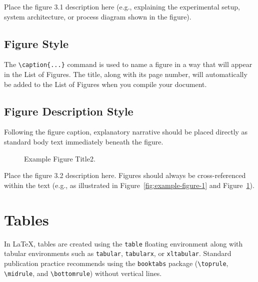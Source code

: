 Place the figure 3.1 description here (e.g., explaining the experimental setup, system architecture, or process diagram shown in the figure).

\subsection{Figure Style}
\label{sec:figure-style}

The \texttt{\textbackslash caption\{...\}} command is used to name a figure in a way that will appear in the List of Figures. The title, along with its page number, will automatically be added to the List of Figures when you compile your document.

\subsection{Figure Description Style}
\label{sec:figure-desc-style}

Following the figure caption, explanatory narrative should be placed directly as standard body text immediately beneath the figure.

\begin{figure}[htbp]
  \centering
  \caption{Example Figure Title2.}
  \label{fig:example-figure-2}
\end{figure}

Place the figure 3.2 description here. Figures should always be cross-referenced within the text (e.g., as illustrated in Figure~\ref{fig:example-figure-1} and Figure~\ref{fig:example-figure-2}).

\section{Tables}
\label{sec:tables}

In LaTeX, tables are created using the \texttt{table} floating environment along with tabular environments such as \texttt{tabular}, \texttt{tabularx}, or \texttt{xltabular}. Standard publication practice recommends using the \texttt{booktabs} package (\texttt{\textbackslash toprule}, \texttt{\textbackslash midrule}, and \texttt{\textbackslash bottomrule}) without vertical lines.

